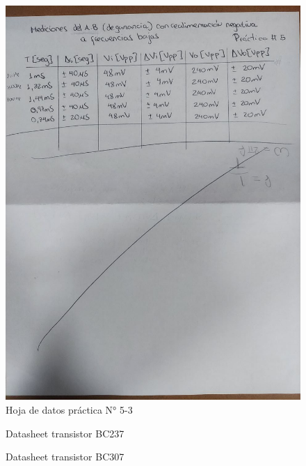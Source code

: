 \begin{figure}[ht]
    \centering
    \includegraphics[width=1.0\textwidth, angle=90]{src/images/p5/p5-hoja-de-datos-3.jpg}
    \caption{Hoja de datos práctica N° 5-3}
    \label{fig:hoja-de-datos-p5-3}
\end{figure}

\begin{figure}[ht]
    \centering
    
    \caption{Datasheet transistor BC237}
    \label{fig:datasheet-bc237}
\end{figure}

\begin{figure}[ht]
    \centering
    
    \caption{Datasheet transistor BC307}
    \label{fig:datasheet-bc307}
\end{figure}

